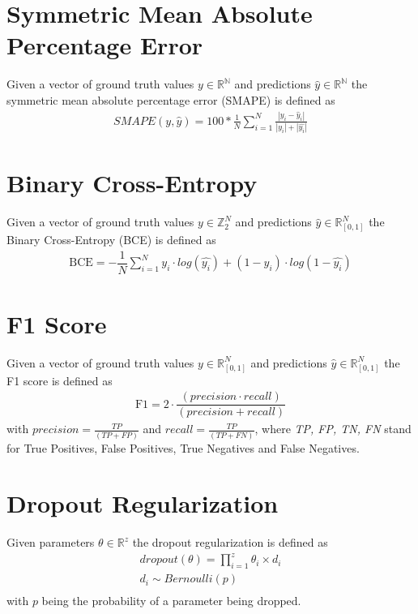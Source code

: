 \section{Symmetric Mean Absolute Percentage Error}
Given a vector of ground truth values $y \in \mathbb{R^N}$ and predictions $\widehat{y} \in \mathbb{R^N}$ the symmetric mean absolute percentage error (SMAPE) is defined as 
\begin{equation}
  \begin{gathered} 
  \label{smape}
     SMAPE(y, \widehat{y}) = 100 *
    \frac{1}{N} 
    \sum_{i=1}^{N}
    \frac{| y_{i} - \widehat{y}_{i} |} {|y_{i}| + |\widehat{y_{i}}|}  
  \end{gathered}
\end{equation}

\section{Binary Cross-Entropy}
Given a vector of ground truth values $y \in \mathbb{Z}_2^N$ and predictions $\widehat{y} \in \mathbb{R}^N_{[0, 1]}$ the Binary Cross-Entropy (BCE)  is defined as 
\begin{gather}
\label{bce}
    \text{BCE}=
        -\dfrac
            {1}
            {N}
        \sum\limits_{i=1}^{N}  y_i \cdot log(\hat{y_i}) + (1-y_i) \cdot log(1 - \hat{y_i})
\end{gather}

\section{F1 Score}
Given a vector of ground truth values $y \in \mathbb{R}^N_{[0, 1]}$ and predictions $\widehat{y} \in \mathbb{R}^N_{[0, 1]}$ the F1 score is defined as 
\begin{gather}
\label{F1}
    \text{F1}=
        2 \cdot 
        \dfrac
            {(precision \cdot recall)}
            {(precision + recall)}
\end{gather}
with $precision =\frac {TP}{(TP + FP)}$ and $recall = \frac {TP}{(TP + FN)}$, where \textit{TP, FP, TN, FN} stand for True Positives, False Positives, True Negatives and False Negatives. 

\section{Dropout Regularization}
Given parameters $\theta \in \mathbb{R}^z$ the dropout regularization is defined as 
\begin{gather}
    \label{dropout}
    dropout(\theta) = \prod^z _{i=1} \theta_i \times d_i \\ \nonumber
    d_i \sim Bernoulli(p) \\ \nonumber
\end{gather}
with $p$ being the probability of a parameter being dropped. 

